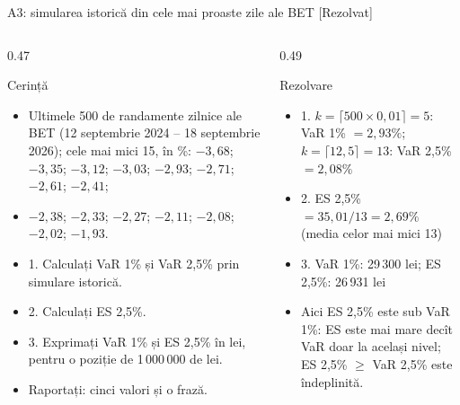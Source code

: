 \begin{frame}{A3: simularea istorică din cele mai proaste zile ale BET [Rezolvat]}
\itemsize{\scriptsize}
\begin{columns}[T]
\begin{column}{0.47\textwidth}
\begin{block}{Cerință}
\begin{itemize}
    \item Ultimele 500 de randamente zilnice ale BET (12 septembrie 2024 -- 18 septembrie 2026); cele mai mici 15, în \%: $-3{,}68$; $-3{,}35$; $-3{,}12$; $-3{,}03$; $-2{,}93$; $-2{,}71$; $-2{,}61$; $-2{,}41$;
    \item $-2{,}38$; $-2{,}33$; $-2{,}27$; $-2{,}11$; $-2{,}08$; $-2{,}02$; $-1{,}93$.
    \item 1. Calculați VaR 1\% și VaR 2,5\% prin simulare istorică.
    \item 2. Calculați ES 2,5\%.
    \item 3. Exprimați VaR 1\% și ES 2,5\% în lei, pentru o poziție de 1\,000\,000 de lei.
    \item Raportați: cinci valori și o frază.
\end{itemize}
\end{block}
\end{column}
\begin{column}{0.49\textwidth}
\begin{exampleblock}{Rezolvare}
\begin{itemize}
    \item 1. $k = \lceil 500 \times 0{,}01 \rceil = 5$: VaR 1\% $= 2{,}93\%$; $k = \lceil 12{,}5 \rceil = 13$: VaR 2,5\% $= 2{,}08\%$
    \item 2. ES 2,5\% $= 35{,}01/13 = 2{,}69\%$ (media celor mai mici 13)
    \item 3. VaR 1\%: 29\,300 lei; ES 2,5\%: 26\,931 lei
    \item Aici ES 2,5\% este sub VaR 1\%: ES este mai mare decît VaR doar la același nivel; ES 2,5\% $\ge$ VaR 2,5\% este îndeplinită.
\end{itemize}
\end{exampleblock}
\end{column}
\end{columns}
\end{frame}

